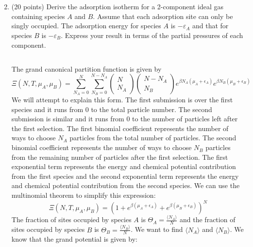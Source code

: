 \documentclass[12pt]{article}
\begin{document}
\section{}
\begin{enumerate}
  \setcounter{enumi}{1}
  \item (20 points) Derive the adsorption isotherm for a 2-component ideal gas containing species $A$ and $B$. Assume that each adsorption site can only be singly occupied. The adsorption energy for species $A$ is $-\varepsilon_{A}$ and that for species $B$ is $-\varepsilon_{B}$. Express your result in terms of the partial pressures of each component.
\subsection{}
The grand canonical partition function is given by 
\begin{equation}
\Xi\left(N, T, \mu_A, \mu_B\right)=\sum_{N_A=0}^N \sum_{N_B=0}^{N-N_A}\left(\begin{array}{c}
N \\
N_A
\end{array}\right)\left(\begin{array}{c}
N-N_A \\
N_B
\end{array}\right) e^{\beta N_A\left(\mu_A+\epsilon_A\right)} e^{\beta N_B\left(\mu_B+\epsilon_B\right)}
\end{equation}
We will attempt to explain this form. The first submission is over the first species and it runs from 0 to the total particle number. The second submission is similar and it runs from 0 to the number of particles left after the first selection. The first binomial coefficient represents the number of ways to choose $N_A$ particles from the total number of particles. The second binomial coefficient represents the number of ways to choose $N_B$ particles from the remaining number of particles after the first selection. The first exponential term represents the energy and chemical potential contribution from the first species and the second exponential term represents the energy and chemical potential contribution from the second species. We can use the multinomial theorem to simplify this expression:
\begin{equation}
\Xi\left(N, T, \mu_A, \mu_B\right)=(1+e^{\beta\left(\mu_A+\epsilon_A\right)}+e^{\beta\left(\mu_B+\epsilon_B\right)})^N
\end{equation}
The fraction of sites occupied by species $A$ is $\Theta _{A} = \frac{\langle N_A \rangle}{N}$ and the fraction of sites occupied by species $B$ is $\Theta _{B} = \frac{\langle N_B \rangle}{N}$. We want to find $\langle N_A \rangle$ and $\langle N_B \rangle$. We know that the grand potential is given by:

\end{enumerate}
\end{document}
